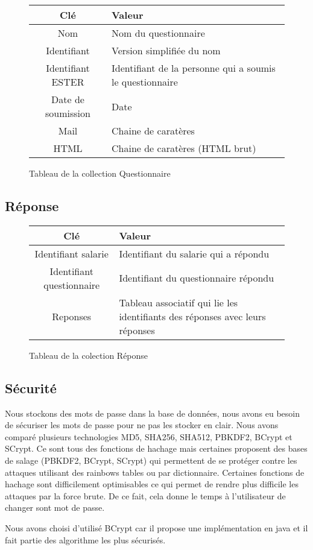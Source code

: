 \begin{figure}[H]
    \begin{center}
        \begin{tabularx}{17cm}{|c|X|}
            \hline
            Clé & Valeur  \tabularnewline 
            \hline
            Nom & 
            Nom du questionnaire \tabularnewline 
            Identifiant & 
            Version simplifiée du nom \tabularnewline
            Identifiant ESTER & 
            Identifiant de la personne qui a soumis le questionnaire \tabularnewline
            Date de soumission & 
            Date \tabularnewline
            Mail & 
            Chaine de caratères \tabularnewline
            HTML & 
            Chaine de caratères (HTML brut) \tabularnewline
            \hline
        \end{tabularx}
    \end{center}
    \caption{Tableau de la collection Questionnaire}
\end{figure}

\subsection{Réponse}

\begin{figure}[H]
    \begin{center}
        \begin{tabularx}{17cm}{|c|X|}
            \hline
            Clé & Valeur  \tabularnewline 
            \hline
            Identifiant salarie & 
            Identifiant du salarie qui a répondu \tabularnewline
            Identifiant questionnaire & 
            Identifiant du questionnaire répondu \tabularnewline
            Reponses & 
            Tableau associatif qui lie les identifiants des réponses 
            avec leurs réponses \tabularnewline
            \hline
        \end{tabularx}
    \end{center}
    \caption{Tableau de la colection Réponse}
\end{figure}
\subsection{Sécurité}

Nous stockons des mots de passe dans la base de données, nous avons eu besoin de sécuriser les mots de passe pour ne pas les stocker en clair.
Nous avons comparé plusieurs technologies MD5, SHA256, SHA512, PBKDF2, BCrypt et SCrypt. Ce sont tous des fonctions de hachage mais certaines proposent des bases de salage (PBKDF2, BCrypt, SCrypt) qui permettent de se protéger contre les attaques utilisant des rainbows tables ou par dictionnaire. 
Certaines fonctions de hachage sont difficilement optimisables ce qui permet de rendre plus difficile les attaques par la force brute. De ce fait, cela donne le temps à l'utilisateur de changer sont mot de passe.     

Nous avons choisi d'utilisé BCrypt car il propose une implémentation en java et il fait partie des algorithme les plus sécurisés.